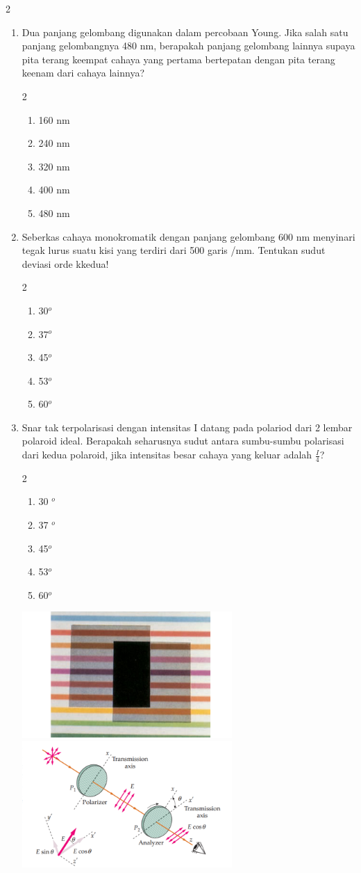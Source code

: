 \documentclass[11pt,a4paper]{extarticle}
\newcommand{\pilgani}[1]{                            \vspace{-0.3cm}\begin{multicols}{2}
 \begin{enumerate}[label=\Alph*., itemsep=0pt,topsep=0pt,leftmargin=*,align=Center]#1                     \end{enumerate}
 \phantom{ini cuma sapi, wedus, dan ayam}
 \end{multicols}}
\begin{document}
\begin{multicols*}{2}
\begin{enumerate}
\vspace{3cm} \item Dua panjang gelombang digunakan dalam percobaan Young. Jika salah satu panjang gelombangnya 480 nm, berapakah panjang gelombang lainnya supaya pita terang keempat cahaya yang pertama bertepatan dengan pita terang keenam dari cahaya lainnya?  \pilgani{
        \item 160 nm
        \item 240 nm
        \item 320 nm
       \item 400 nm
        \item 480 nm



} \vspace{3cm} \item Seberkas cahaya monokromatik dengan panjang gelombang 600 nm menyinari tegak lurus suatu kisi yang terdiri dari 500 garis /mm. Tentukan sudut deviasi orde kkedua!  \pilgani{ \item 30$^o$
        \item 37$^o$
        \item 45$^o$
        \item 53$^o$
        \item 60$^o$
        }

\vspace{3cm}

\item Snar tak terpolarisasi dengan intensitas I datang pada polariod dari 2 lembar polaroid ideal. Berapakah seharusnya sudut antara sumbu-sumbu polarisasi dari kedua polaroid, jika intensitas besar cahaya yang keluar adalah $\frac{I}{4}$?
\pilgani{
        \item 30 $^o$
        \item 37 $^o$
        \item 45$^o$
        \item 53$^o$
        \item 60$^o$
        }

\includegraphics[width=8cm]{pic/polarisasi2}
\includegraphics[width=8cm]{pic/polarisasi}
\vspace{3cm}


\end{enumerate}
\end{multicols*}
\end{document}
